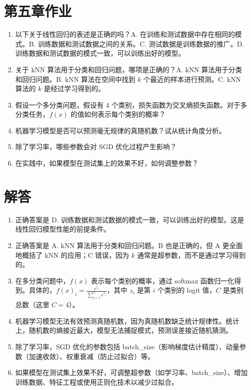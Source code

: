 \documentclass[a4paper,12pt]{book}
\begin{document}
\section*{第五章作业}

\begin{enumerate}
    \item 以下关于线性回归的表述是正确的吗？A. 在训练和测试数据中存在相同的模式。B. 训练数据和测试数据之间的关系。C. 测试数据是训练数据的推广。D. 训练数据和测试数据的模式一致，可以训练出好的模型。
    \item 关于 kNN 算法用于分类和回归问题，哪项是正确的？A. kNN 算法用于分类和回归问题。B. kNN 算法在空间中找到 $k$ 个最近的样本进行预测。C. kNN 算法的 $k$ 是经过学习得到的。
    \item 假设一个多分类问题，假设有 4 个类别，损失函数为交叉熵损失函数。对于多分类任务，$f(x)$ 的值如何表示每个类别的概率？
    \item 机器学习模型是否可以预测毫无规律的真随机数？试从统计角度分析。
    \item 除了学习率，哪些参数会对 SGD 优化过程产生影响？
    \item 在实践中，如果模型在测试集上的效果不好，如何调整参数？
\end{enumerate}

\section*{解答}

\begin{enumerate}
    \item 正确答案是 D. 训练数据和测试数据的模式一致，可以训练出好的模型。这是线性回归模型性能的前提条件。
    \item 正确答案是 A. kNN 算法用于分类和回归问题。B 也是正确的，但 A 更全面地概括了 kNN 的应用；C 错误，因为 $k$ 通常是超参数，而不是通过学习得到的。
    \item 在多分类问题中，$f(x)$ 表示每个类别的概率，通过 softmax 函数归一化得到。具体的，$f(x)_i = \frac{e^{z_i}}{\sum_{j=1}^C e^{z_j}}$，其中 $z_i$ 是第 $i$ 个类别的 logit 值，$C$ 是类别总数（这里 $C = 4$）。
    \item 机器学习模型无法有效预测真随机数，因为真随机数缺乏统计规律性。统计上，随机数的熵接近最大，模型无法捕捉模式，预测误差接近随机猜测。
    \item 除了学习率，SGD 优化的参数包括 batch\_size（影响梯度估计精度）、动量参数（加速收敛）、权重衰减（防止过拟合）等。
    \item 如果模型在测试集上效果不好，可调整超参数（如学习率、batch\_size）、增加训练数据、特征工程或使用正则化技术以减少过拟合。
\end{enumerate}
\end{document}
